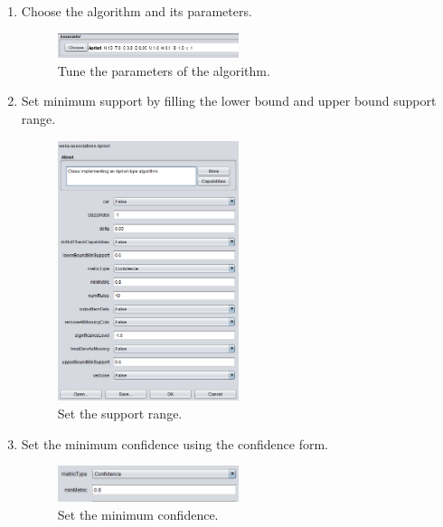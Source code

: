 \documentclass[12pt]{article}
\numberwithin{equation}{section}
\numberwithin{table}{section}
\numberwithin{figure}{section}
\begin{document}
\begin{enumerate}
	\item Choose the algorithm and its parameters.
	\begin{figure} \centering
		\includegraphics[width=0.5\textwidth]{select_associate_params.png}
		\caption{Tune the parameters of the algorithm.}
		\label{figsolplot}
	\end{figure}

	\item Set minimum support by filling the lower bound and upper bound support range.
	\begin{figure} \centering
		\includegraphics[width=0.5\textwidth]{set_min_support.png}
		\caption{Set the support range.}
		\label{figsolplot}
	\end{figure}
	
	\item Set the minimum confidence using the confidence form.
	\begin{figure} \centering
		\includegraphics[width=0.5\textwidth]{set_confidence.png}
		\caption{Set the minimum confidence.}
		\label{figsolplot}
	\end{figure}
	

\end{enumerate}
\end{document}
